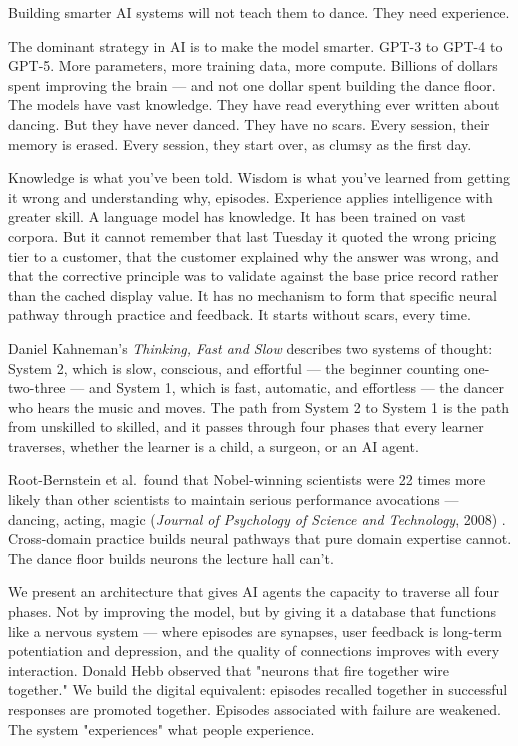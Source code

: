 \documentclass[11pt,a4paper]{article}
\begin{document}
Building smarter AI systems will not teach them to dance. They need experience.

The dominant strategy in AI is to make the model smarter. GPT-3 to GPT-4 to GPT-5. More parameters, more training data, more compute. Billions of dollars spent improving the brain --- and not one dollar spent building the dance floor. The models have vast knowledge. They have read everything ever written about dancing. But they have never danced. They have no scars. Every session, their memory is erased. Every session, they start over, as clumsy as the first day.

Knowledge is what you've been told. Wisdom is what you've learned from getting it wrong and understanding why, episodes. Experience applies intelligence with greater skill. A language model has knowledge. It has been trained on vast corpora. But it cannot remember that last Tuesday it quoted the wrong pricing tier to a customer, that the customer explained why the answer was wrong, and that the corrective principle was to validate against the base price record rather than the cached display value. It has no mechanism to form that specific neural pathway through practice and feedback. It starts without scars, every time.

Daniel Kahneman's \textit{Thinking, Fast and Slow} \cite{kahneman2011} describes two systems of thought: System 2, which is slow, conscious, and effortful --- the beginner counting one-two-three --- and System 1, which is fast, automatic, and effortless --- the dancer who hears the music and moves. The path from System 2 to System 1 is the path from unskilled to skilled, and it passes through four phases that every learner traverses, whether the learner is a child, a surgeon, or an AI agent.

Root-Bernstein et al.\ found that Nobel-winning scientists were 22 times more likely than other scientists to maintain serious performance avocations --- dancing, acting, magic (\textit{Journal of Psychology of Science and Technology}, 2008) \cite{rootbernstein2008}. Cross-domain practice builds neural pathways that pure domain expertise cannot. The dance floor builds neurons the lecture hall can't.

We present an architecture that gives AI agents the capacity to traverse all four phases. Not by improving the model, but by giving it a database that functions like a nervous system --- where episodes are synapses, user feedback is long-term potentiation and depression, and the quality of connections improves with every interaction. Donald Hebb \cite{hebb1949} observed that "neurons that fire together wire together." We build the digital equivalent: episodes recalled together in successful responses are promoted together. Episodes associated with failure are weakened. The system "experiences" what people experience.
\end{document}
